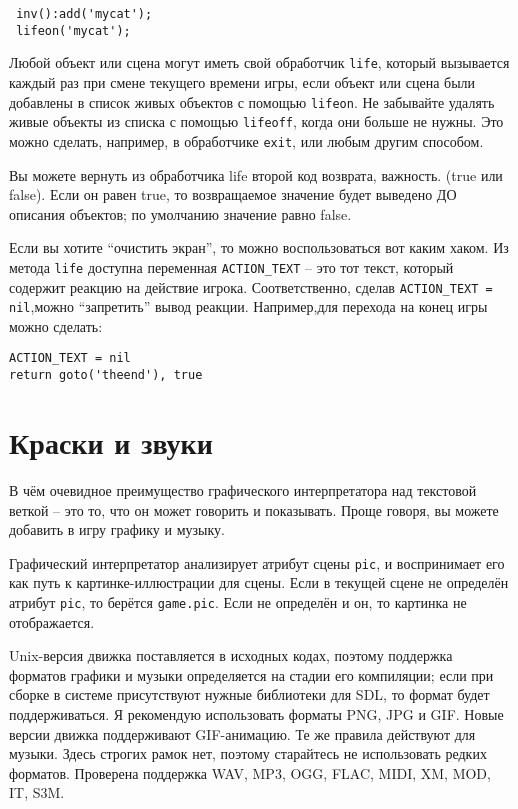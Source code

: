 \documentclass[a4paper,12pt]{article}
\begin{document}
\begin{verbatim}
 inv():add('mycat');
 lifeon('mycat');
\end{verbatim}

Любой объект или сцена могут иметь свой обработчик \verb/life/, который вызывается каждый раз при смене текущего времени игры, если объект или сцена были добавлены в список живых объектов с помощью \verb/lifeon/. Не забывайте удалять живые объекты из списка с помощью \verb/lifeoff/, когда они больше не нужны. Это можно сделать, например, в обработчике \verb/exit/, или любым другим способом.

Вы можете вернуть из обработчика life второй код возврата, важность. (true или false). Если он равен true, то возвращаемое значение будет выведено ДО описания объектов; по умолчанию значение равно false.

Если вы хотите ``очистить экран'', то можно воспользоваться вот каким хаком. Из метода \verb/life/ доступна переменная \verb/ACTION_TEXT/ -- это тот текст, который содержит реакцию на действие игрока. Соответственно, сделав \verb/ACTION_TEXT = nil/,можно ``запретить'' вывод реакции. Например,для перехода на конец игры можно сделать:

\begin{verbatim}
ACTION_TEXT = nil
return goto('theend'), true
\end{verbatim}

\section{Краски и звуки}

В чём очевидное преимущество графического интерпретатора над текстовой веткой -- это то, что он может говорить и показывать. Проще говоря, вы можете добавить в игру графику и музыку.

Графический интерпретатор анализирует атрибут сцены \verb/pic/, и воспринимает его как путь к картинке-иллюстрации для сцены. Если в текущей сцене не определён атрибут \verb/pic/, то берётся \verb/game.pic/. Если не определён и он, то картинка не отображается.

Unix-версия движка поставляется в исходных кодах, поэтому поддержка форматов графики и музыки определяется на стадии его компиляции; если при сборке в системе присутствуют нужные библиотеки для SDL, то формат будет поддерживаться. Я рекомендую использовать форматы PNG, JPG и GIF. Новые версии движка поддерживают GIF-анимацию. Те же правила действуют для музыки. Здесь строгих рамок нет, поэтому старайтесь не использовать редких форматов. Проверена поддержка WAV, MP3, OGG, FLAC, MIDI, XM, MOD, IT, S3M.
\end{document}
